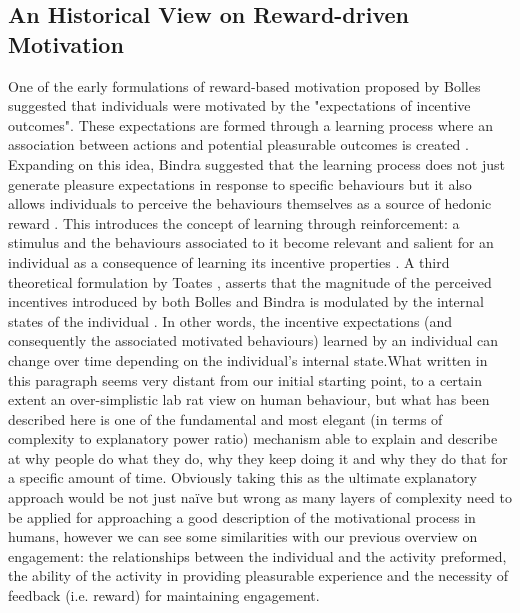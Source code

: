 \subsection{An Historical View on Reward-driven Motivation}
\label{motivation_hist}
One of the early formulations of reward-based motivation proposed by Bolles \cite{bolles1972reinforcement} suggested that individuals were motivated by the "expectations of incentive outcomes". These expectations are formed through a learning process where an association between actions and potential pleasurable outcomes is created \cite{bolles1972reinforcement,berridge2004motivation}. Expanding on this idea, Bindra suggested that the learning process does not just generate pleasure expectations in response to specific behaviours but it also allows individuals to perceive the behaviours themselves as a source of hedonic reward \cite{bindra1978adaptive,berridge2004motivation}.
This introduces the concept of learning through reinforcement: a stimulus and the behaviours associated to it become relevant and salient for an individual as a consequence of learning its incentive properties \cite{berridge2004motivation}. A third theoretical formulation by Toates \cite{toates1994comparing}, asserts that the magnitude of the perceived incentives introduced by both Bolles and Bindra is modulated by the internal states of the individual \cite{toates1994comparing,berridge2004motivation}. In other words, the incentive expectations (and consequently the associated motivated behaviours) learned by an individual can change over time depending on the individual's internal state.What written in this paragraph seems very distant from our initial starting point, to a certain extent an over-simplistic lab rat view on human behaviour, but what has been described here is one of the fundamental and most elegant (in terms of complexity to explanatory power ratio) mechanism able to explain and describe at why people do what they do, why they keep doing it and why they do that for a specific amount of time. Obviously taking this as the ultimate explanatory approach would be not just naïve but wrong as many layers of complexity need to be applied for approaching a good description of the motivational process in humans, however we can see some similarities with our previous overview on engagement: the relationships between the individual and the activity preformed, the ability of the activity in providing pleasurable experience and the necessity of feedback (i.e. reward) for maintaining engagement.


